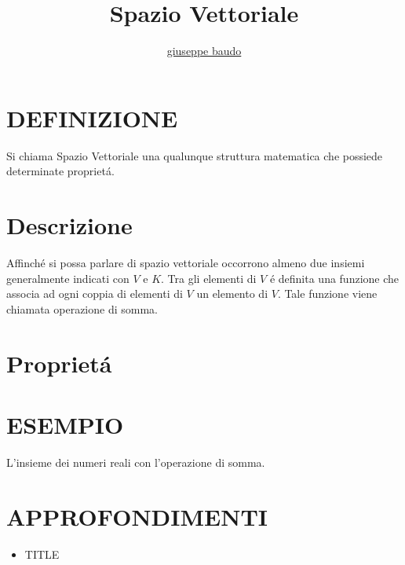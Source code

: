 \documentclass[a4paper,10pt]{article}
\title{Spazio Vettoriale}
\author{\href{http://www.baudo.hol.es}{giuseppe baudo}}
\begin{document}
\maketitle

\section{DEFINIZIONE}
Si chiama Spazio Vettoriale una qualunque struttura matematica che possiede determinate propriet\'{a}.

\section{Descrizione}
Affinch\'{e} si possa parlare di spazio vettoriale occorrono almeno due insiemi generalmente indicati con $V$ e $K$. Tra gli elementi di $V$ \'{e} definita
una funzione che associa ad ogni coppia di elementi di $V$ un elemento di $V$. Tale funzione viene chiamata operazione di somma.
\section{Propriet\'{a}}


\section{ESEMPIO}
L'insieme dei numeri reali con l'operazione di somma.

\section{APPROFONDIMENTI}
\begin{itemize}
 \item TITLE
\end{itemize}
\end{document}
